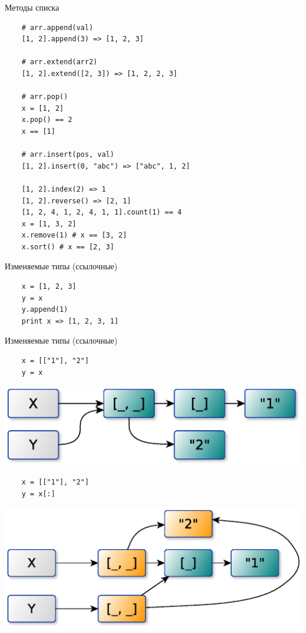 \documentclass{article}
\begin{document}
\begin{center} Методы списка \end{center}
\begin{Large}
\vspace{15pt}
\begin{lstlisting}
	# arr.append(val)
	[1, 2].append(3) => [1, 2, 3]

	# arr.extend(arr2)
	[1, 2].extend([2, 3]) => [1, 2, 2, 3]

	# arr.pop()
	x = [1, 2]
	x.pop() == 2
	x == [1]

	# arr.insert(pos, val)
	[1, 2].insert(0, "abc") => ["abc", 1, 2]

	[1, 2].index(2) => 1
	[1, 2].reverse() => [2, 1]
	[1, 2, 4, 1, 2, 4, 1, 1].count(1) == 4
	x = [1, 3, 2]
	x.remove(1) # x == [3, 2]
	x.sort() # x == [2, 3]
\end{lstlisting}
\end{Large}
\newpage

\begin{center} Изменяемые типы (ссылочные) \end{center}
\vspace{15pt}
\begin{lstlisting}
	x = [1, 2, 3]
	y = x
	y.append(1)
	print x => [1, 2, 3, 1]
\end{lstlisting}
\newpage

\begin{center} Изменяемые типы (ссылочные) \end{center}
\begin{lstlisting}
	x = [["1"], "2"]
	y = x
\end{lstlisting}
\includegraphics[scale=0.8]{images/refs1.eps}

\begin{lstlisting}
	x = [["1"], "2"]
	y = x[:]
\end{lstlisting}
\includegraphics[scale=0.8]{images/refs2.eps}
\newpage
\end{document}
